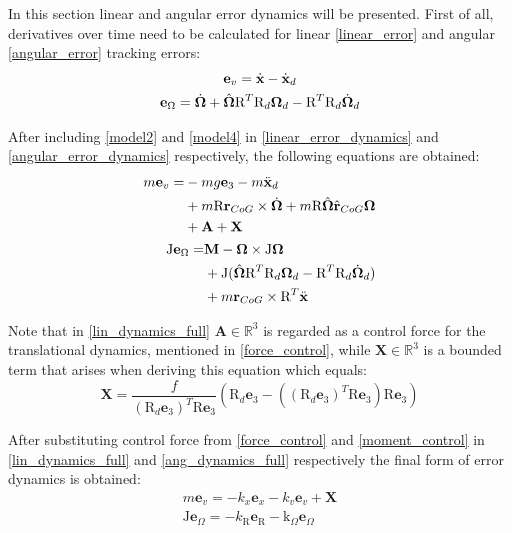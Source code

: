 In this section linear and angular error dynamics will be presented. First of all, derivatives over time need to be calculated for linear \ref{linear_error} and angular \ref{angular_error} tracking errors:
\begin{gather}
	\textbf{e}_v = \dot{\textbf{x}} - \dot{\textbf{x}}_d \label{linear_error_dynamics}\\
	\textbf{e}_\Omega = \dot{\boldsymbol{\Omega}} + \hat{\boldsymbol{\Omega}}\text{R}^T\text{R}_d\boldsymbol{\Omega}_d - \text{R}^T\text{R}_d\dot{\boldsymbol{\Omega}}_d \label{angular_error_dynamics}
\end{gather}

\noindent After including \ref{model2} and \ref{model4} in \ref{linear_error_dynamics} and \ref{angular_error_dynamics} respectively, the following equations are obtained:
\begin{align}
	\label{lin_dynamics_full}
	\begin{split}
		m\textbf{e}_v = & - mg\textbf{e}_3 - m\ddot{\textbf{x}}_d \\
			&+ m\text{R}\textbf{r}_{CoG}  \times \dot{\boldsymbol{\Omega}} + m\text{R}\hat{\boldsymbol{\Omega}}\hat{\textbf{r}}_{CoG}\boldsymbol{\Omega} \\
			&+ \textbf{A} + \textbf{X}	
	\end{split} \\
	\label{ang_dynamics_full}
	\begin{split}
		\text{J}\textbf{e}_\Omega = &\textbf{M} - \boldsymbol{\Omega} \times \text{J}\boldsymbol{\Omega} \\
			&+ \text{J}(\hat{\boldsymbol{\Omega}}\text{R}^T\text{R}_d\boldsymbol{\Omega}_d - \text{R}^T\text{R}_d\dot{\boldsymbol{\Omega}}_d) \\
			&+ m\textbf{r}_{CoG} \times \text{R}^T \ddot{\textbf{x}}
	\end{split}
\end{align}

\noindent Note that in \ref{lin_dynamics_full} $\textbf{A}\in \mathbb{\text{R}}^3$ is regarded as a control force for the translational dynamics, mentioned in \ref{force_control}, while $\textbf{X}\in\mathbb{\text{R}}^3$ is a bounded term that arises when deriving this equation which equals:
\begin{equation}
	\textbf{X} = \frac{f}{(\text{R}_d\textbf{e}_3)^T\text{R}\textbf{e}_3}(\text{R}_d \textbf{e}_3 - ((\text{R}_d\textbf{e}_3)^T\text{R}\textbf{e}_3)\text{R}\textbf{e}_3)
\end{equation}

\noindent After substituting control force from \ref{force_control} and \ref{moment_control} in \ref{lin_dynamics_full} and \ref{ang_dynamics_full} respectively the final form of error dynamics is obtained:
\begin{gather}
	m\textbf{e}_v = -k_x \textbf{e}_x - k_v \textbf{e}_v + \textbf{X} \label{error_dynamics_linear}\\ 
	\text{J}\textbf{e}_\Omega = -k_\text{R} \textbf{e}_\text{R} - \text{k}_\Omega \textbf{e}_\Omega \label{error_dynamics_angular}
\end{gather}

